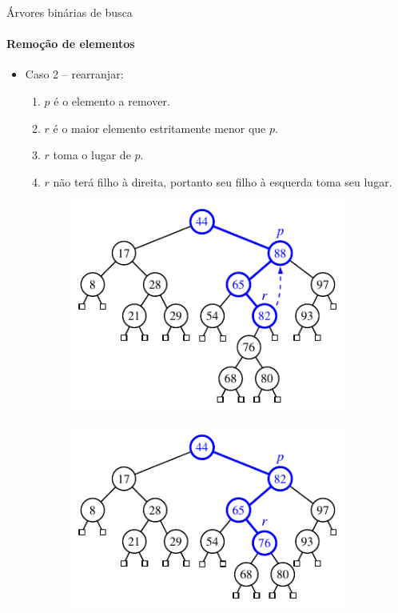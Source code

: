 \begin{frame}{Árvores binárias de busca}
\framesubtitle{Remoção de elementos}
\begin{itemize}
	\item Caso 2 -- rearranjar:
	\begin{enumerate}
		\item $p$ é o elemento a remover.
		\item $r$ é o maior elemento estritamente menor que $p$.
		\item $r$ toma o lugar de $p$.
		\item $r$ não terá filho à direita, portanto seu filho à esquerda toma seu lugar.
	\end{enumerate}
\end{itemize}

\begin{figure}
	\centering
	\begin{subfigure}
		\centering
		\includegraphics[width=.4\linewidth]{img/figure-11-6a}
	\end{subfigure}%
	\hspace{10pt}
	\begin{subfigure}
		\centering
		\includegraphics[width=.39\linewidth]{img/figure-11-6b}
		\begin{minipage}{.1cm}
			\vfill
		\end{minipage}
	\end{subfigure}
\end{figure}
\end{frame}




